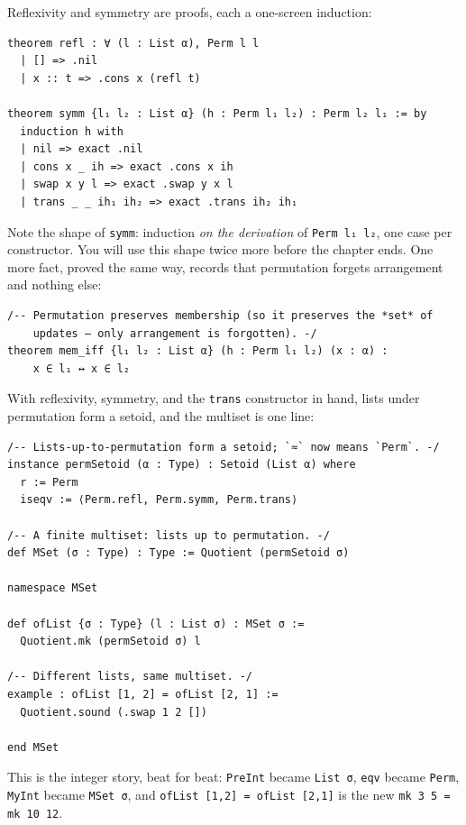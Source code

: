 \documentclass[12pt, a4paper, openright]{book}
\theoremstyle{thmstyle}
\theoremstyle{defstyle}
\newcommand{\lc}[1]{\texttt{#1}}
\begin{document}
Reflexivity and symmetry are proofs, each a one-screen induction:

\begin{verbatim}
theorem refl : ∀ (l : List α), Perm l l
  | [] => .nil
  | x :: t => .cons x (refl t)

theorem symm {l₁ l₂ : List α} (h : Perm l₁ l₂) : Perm l₂ l₁ := by
  induction h with
  | nil => exact .nil
  | cons x _ ih => exact .cons x ih
  | swap x y l => exact .swap y x l
  | trans _ _ ih₁ ih₂ => exact .trans ih₂ ih₁
\end{verbatim}

Note the shape of \lc{symm}: induction \emph{on the derivation} of
\lc{Perm l₁ l₂}, one case per constructor. You will use this shape twice
more before the chapter ends. One more fact, proved the same way, records
that permutation forgets arrangement and nothing else:

\begin{verbatim}
/-- Permutation preserves membership (so it preserves the *set* of
    updates — only arrangement is forgotten). -/
theorem mem_iff {l₁ l₂ : List α} (h : Perm l₁ l₂) (x : α) :
    x ∈ l₁ ↔ x ∈ l₂
\end{verbatim}

With reflexivity, symmetry, and the \lc{trans} constructor in hand, lists
under permutation form a setoid, and the multiset is one line:

\begin{verbatim}
/-- Lists-up-to-permutation form a setoid; `≈` now means `Perm`. -/
instance permSetoid (α : Type) : Setoid (List α) where
  r := Perm
  iseqv := ⟨Perm.refl, Perm.symm, Perm.trans⟩

/-- A finite multiset: lists up to permutation. -/
def MSet (σ : Type) : Type := Quotient (permSetoid σ)

namespace MSet

def ofList {σ : Type} (l : List σ) : MSet σ :=
  Quotient.mk (permSetoid σ) l

/-- Different lists, same multiset. -/
example : ofList [1, 2] = ofList [2, 1] :=
  Quotient.sound (.swap 1 2 [])

end MSet
\end{verbatim}

This is the integer story, beat for beat: \lc{PreInt} became
\lc{List σ}, \lc{eqv} became \lc{Perm}, \lc{MyInt} became \lc{MSet σ},
and \lc{ofList [1,2] = ofList [2,1]} is the new
\lc{mk 3 5 = mk 10 12}.

\end{document}
